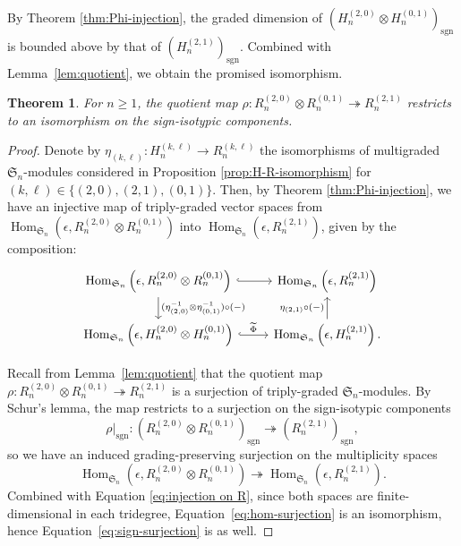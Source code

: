 \documentclass[11pt, noadjust, reqno]{amsart}
\newtheorem{theorem}{Theorem}[section]
\theoremstyle{definition}
\theoremstyle{remark}
\numberwithin{equation}{section}
\newcommand{\0}{\emptyset}
\renewcommand{\S}{\mathfrak{S}}
\DeclareMathOperator{\sgn}{sgn}
\DeclareMathOperator{\Hom}{Hom}
\begin{document}
By Theorem \ref{thm:Phi-injection}, the graded dimension of $(H_n^{(2,0)} \otimes H_n^{(0,1)})_{\sgn}$ is bounded above by that of $(H_n^{(2,1)})_{\sgn}$. 
Combined with Lemma~\ref{lem:quotient}, we obtain the promised isomorphism.



\begin{theorem}\label{thm:main}
For $n \geq 1$, the quotient map $\rho: R_n^{(2,0)} \otimes R_n^{(0,1)} \twoheadrightarrow R_n^{(2,1)}$ restricts to an isomorphism on the sign-isotypic components.
\end{theorem}

\begin{proof}
Denote by $\eta_{(k,\ell)}: H_n^{(k,\ell)} \to R_n^{(k,\ell)}$ the isomorphisms of multigraded $\S_n$-modules considered in Proposition \ref{prop:H-R-isomorphism} for $(k,\ell)\in\{(2,0),(2,1),(0,1)\}$. Then, by Theorem \ref{thm:Phi-injection}, we have an injective map of triply-graded vector spaces from $ \Hom_{\S_n}\left(\epsilon, R_n^{(2,0)} \otimes R_n^{(0,1)}\right)$ into  $\Hom_{\S_n}\left(\epsilon, R_n^{(2,1)}\right)$, given by the composition:
\begin{equation}\label{eq:injection on R}
\begin{tikzcd}
    \Hom_{\S_n}\left(\epsilon, R_n^{(2,0)} \otimes R_n^{(0,1)}\right)\arrow[d, "(\eta_{(2,0)}^{-1}\otimes \eta_{(0,1)}^{-1})\circ(-) "]\arrow[r,hook]
    &
    \Hom_{\S_n}\left(\epsilon, R_n^{(2,1)}\right)
    \\
     \Hom_{\S_n}\left(\epsilon, H_n^{(2,0)} \otimes H_n^{(0,1)}\right)\arrow[r,hook, "\widetilde{\Phi}"]
    &
    \Hom_{\S_n}\left(\epsilon, H_n^{(2,1)}\right)\arrow[u, "\eta_{(2,1)}\circ (-)"].
\end{tikzcd}
\end{equation}

Recall from Lemma~\ref{lem:quotient} that the quotient map $\rho : R_n^{(2,0)} \otimes R_n^{(0,1)} \twoheadrightarrow  R_n^{(2,1)}$ is a surjection of triply-graded $\mathfrak{S}_n$-modules.
By Schur's lemma, the map restricts to a surjection on the sign-isotypic components
\begin{equation}\label{eq:sign-surjection}
\rho|_{\sgn} : (R_n^{(2,0)} \otimes R_n^{(0,1)})_{\sgn}\twoheadrightarrow  (R_n^{(2,1)})_{\sgn},
\end{equation}
so we have an induced grading-preserving surjection on the multiplicity spaces
\begin{equation}\label{eq:hom-surjection}
  \Hom_{\S_n}(\epsilon, R_n^{(2,0)} \otimes R_n^{(0,1)}) \twoheadrightarrow
    \Hom_{\S_n}(\epsilon, R_n^{(2,1)}).
    \end{equation}
Combined with Equation \eqref{eq:injection on R}, since both spaces are finite-dimensional in each tridegree, Equation~\eqref{eq:hom-surjection} is an isomorphism, hence Equation~\eqref{eq:sign-surjection} is as well.
\end{proof}
\end{document}

